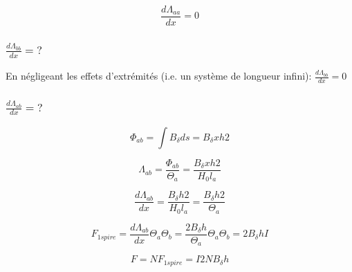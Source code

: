 \documentclass[a4paper,12pt,notitlepage]{article}
\begin{document}
    \begin{equation}
        \frac{d\Lambda_{aa}}{dx} = 0    
    \end{equation}


    \subsubsection{$ \frac{d\Lambda_{bb}}{dx} = ?$}
    En négligeant les effets d'extrémités (i.e. un système de longueur infini):
    $ \frac{d\Lambda_{bb}}{dx} = 0 $


    \subsubsection{$ \frac{d\Lambda_{ab}}{dx} = ?$}

    \begin{equation}
        \Phi_{ab} = \int B_{\delta} ds = B_{\delta} x h 2
    \end{equation}

    \begin{equation}
        \Lambda_{ab} = \frac{\Phi_{ab}}{\Theta_a}
        = \frac{B_{\delta} x h 2}{H_0 l_a}
    \end{equation}

    \begin{equation}
        \frac{d\Lambda_{ab}}{dx} = \frac{B_{\delta} h 2}{H_0 l_a}
        = \frac{B_{\delta} h 2}{\Theta_a}
    \end{equation}

    \begin{equation}
        F_{1spire} = \frac{d\Lambda_{ab}}{dx} \Theta_a \Theta_b
        = \frac{2 B_{\delta} h}{\Theta_a} \Theta_a \Theta_b
        = 2 B_{\delta} h I
    \end{equation}

    \begin{equation}
        F = N F_{1spire} = I 2 N B_{\delta} h
    \end{equation}
\end{document}
